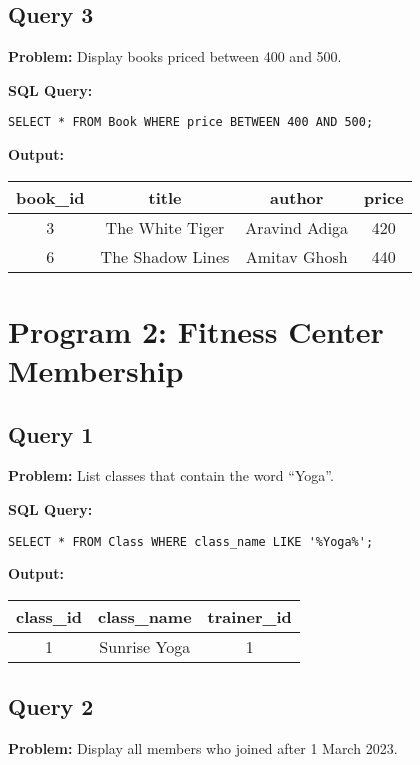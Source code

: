 \documentclass[12pt]{article}
\begin{document}
\subsection*{Query 3}
\textbf{Problem:} Display books priced between 400 and 500.  

\textbf{SQL Query:}  
\begin{verbatim}
SELECT * FROM Book WHERE price BETWEEN 400 AND 500;
\end{verbatim}

\textbf{Output:}

\begin{tabular}{|c|c|c|c|}
\hline
book\_id & title & author & price \\
\hline
3 & The White Tiger & Aravind Adiga & 420 \\
6 & The Shadow Lines & Amitav Ghosh & 440 \\
\hline
\end{tabular}

\vspace{1cm}

\section*{Program 2: Fitness Center Membership}

\subsection*{Query 1}
\textbf{Problem:} List classes that contain the word ``Yoga''.  

\textbf{SQL Query:}  
\begin{verbatim}
SELECT * FROM Class WHERE class_name LIKE '%Yoga%';
\end{verbatim}

\textbf{Output:}

\begin{tabular}{|c|c|c|}
\hline
class\_id & class\_name & trainer\_id \\
\hline
1 & Sunrise Yoga & 1 \\
\hline
\end{tabular}

\vspace{0.5cm}

\subsection*{Query 2}
\textbf{Problem:} Display all members who joined after 1 March 2023.  
\end{document}
